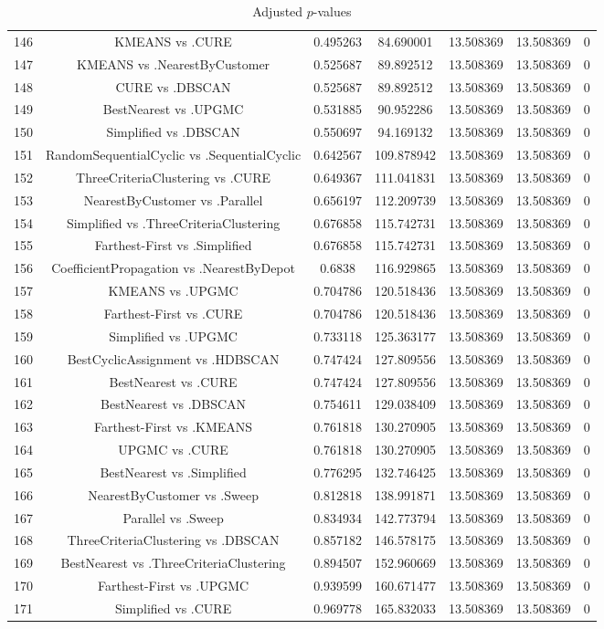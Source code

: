 \documentclass[a4paper,10pt]{article}
\begin{document}
\begin{landscape}
\begin{table}[!htp]
\begin{tabular}{ccccccc}
146&KMEANS vs .CURE&0.495263&84.690001&13.508369&13.508369&0\\
147&KMEANS vs .NearestByCustomer&0.525687&89.892512&13.508369&13.508369&0\\
148&CURE vs .DBSCAN&0.525687&89.892512&13.508369&13.508369&0\\
149&BestNearest vs .UPGMC&0.531885&90.952286&13.508369&13.508369&0\\
150&Simplified vs .DBSCAN&0.550697&94.169132&13.508369&13.508369&0\\
151&RandomSequentialCyclic vs .SequentialCyclic&0.642567&109.878942&13.508369&13.508369&0\\
152&ThreeCriteriaClustering vs .CURE&0.649367&111.041831&13.508369&13.508369&0\\
153&NearestByCustomer vs .Parallel&0.656197&112.209739&13.508369&13.508369&0\\
154&Simplified vs .ThreeCriteriaClustering&0.676858&115.742731&13.508369&13.508369&0\\
155&Farthest-First vs .Simplified&0.676858&115.742731&13.508369&13.508369&0\\
156&CoefficientPropagation vs .NearestByDepot&0.6838&116.929865&13.508369&13.508369&0\\
157&KMEANS vs .UPGMC&0.704786&120.518436&13.508369&13.508369&0\\
158&Farthest-First vs .CURE&0.704786&120.518436&13.508369&13.508369&0\\
159&Simplified vs .UPGMC&0.733118&125.363177&13.508369&13.508369&0\\
160&BestCyclicAssignment vs .HDBSCAN&0.747424&127.809556&13.508369&13.508369&0\\
161&BestNearest vs .CURE&0.747424&127.809556&13.508369&13.508369&0\\
162&BestNearest vs .DBSCAN&0.754611&129.038409&13.508369&13.508369&0\\
163&Farthest-First vs .KMEANS&0.761818&130.270905&13.508369&13.508369&0\\
164&UPGMC vs .CURE&0.761818&130.270905&13.508369&13.508369&0\\
165&BestNearest vs .Simplified&0.776295&132.746425&13.508369&13.508369&0\\
166&NearestByCustomer vs .Sweep&0.812818&138.991871&13.508369&13.508369&0\\
167&Parallel vs .Sweep&0.834934&142.773794&13.508369&13.508369&0\\
168&ThreeCriteriaClustering vs .DBSCAN&0.857182&146.578175&13.508369&13.508369&0\\
169&BestNearest vs .ThreeCriteriaClustering&0.894507&152.960669&13.508369&13.508369&0\\
170&Farthest-First vs .UPGMC&0.939599&160.671477&13.508369&13.508369&0\\
171&Simplified vs .CURE&0.969778&165.832033&13.508369&13.508369&0\\
\hline
\end{tabular}
\caption{Adjusted $p$-values}
\end{table}

\end{landscape}
\end{document}
